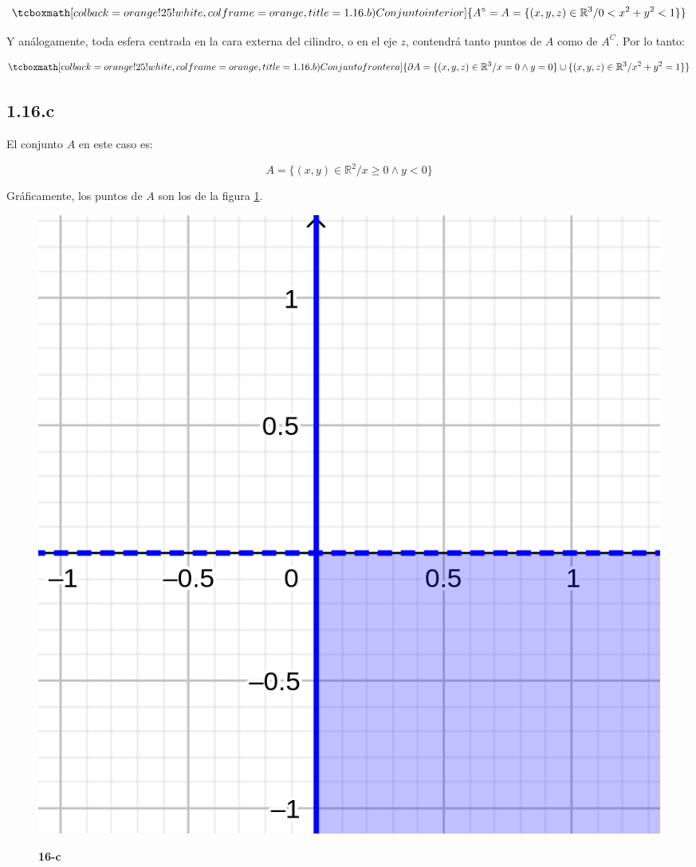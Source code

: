 \documentclass{article}
\renewcommand{\Bbb}{\mathbb}
\begin{document}
\begin{equation}
\tcboxmath[colback=orange!25!white,colframe=orange, title=1.16.b) Conjunto interior]
{ A^{\circ} = A = \{ (x, y, z) \in \Bbb R^3 / 0 < x^2 + y^2 < 1 \}  }
\end{equation}

Y análogamente, toda esfera centrada en la cara externa del cilindro, o en el eje $z$, contendrá tanto puntos de $A$ como de $A^C$. Por lo tanto:

\begin{equation}
\tcboxmath[colback=orange!25!white,colframe=orange, title=1.16.b) Conjunto frontera]
{ \partial{A} = \{(x, y, z) \in \Bbb R^3 / x = 0 \wedge y = 0 \} \cup \{ (x, y, z) \in \Bbb R^3 / x^2 + y^2 = 1 \}  }
\end{equation}

\subsection*{1.16.c}
\label{subsec:1.16.c}

El conjunto $A$ en este caso es:

\begin{equation}
A = \{ (x,y) \in \Bbb R^2 / x \geq 0 \wedge y < 0 \}
\end{equation}

Gráficamente, los puntos de $A$ son los de la figura \ref{fig:1-16-c}.

\begin{figure}[ht]
\caption{\textbf{16-c}}
\includegraphics[scale=2.5]{../img/exercises/guide_01/16_c.png} 
\centering
\label{fig:1-16-c}
\end{figure}
\end{document}

